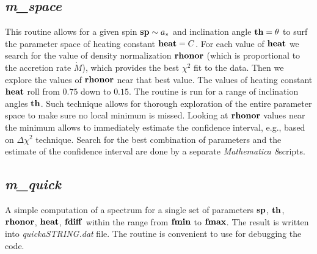 \documentclass{emulateapj}
\newcommand{\mat}{\textit{Mathematica 8}}
\begin{document}
\subsection{\textit{m\_space}}
This routine allows for a given spin ${\bf sp}\sim a_*$ and inclination angle ${\bf th}=\theta$ to surf the parameter space of heating constant ${\bf heat}=C$.
For each value of ${\bf heat}$ we search for the value of density normalization ${\bf rhonor}$ (which is proportional to the accretion rate $\dot{M}$), which provides the best $\chi^2$ fit to the data.
Then we explore the values of ${\bf rhonor}$ near that best value.
The values of heating constant ${\bf heat}$ roll from $0.75$ down to $0.15$.
The routine is run for a range of inclination angles ${\bf th}$.
Such technique allows for thorough exploration of the entire parameter space to make sure no local minimum is missed.
Looking at ${\bf rhonor}$ values near the minimum allows to immediately estimate the confidence interval, e.g., based on $\Delta\chi^2$ technique.
Search for the best combination of parameters and the estimate of the confidence interval are done by a separate \mat  scripts.

\subsection{\textit{m\_quick}}
A simple computation of a spectrum for a single set of parameters ${\bf sp}$, ${\bf th}$, ${\bf rhonor}$, ${\bf heat}$, ${\bf fdiff}$ within the range from
${\bf fmin}$ to ${\bf fmax}$. The result is written into \textit{quickaSTRING.dat} file.
The routine is convenient to use for debugging the code.
\end{document}
